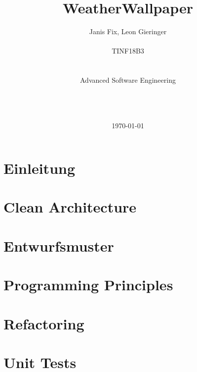 \documentclass[11pt,a4paper]{article}
\title{WeatherWallpaper\vspace{20px}}
\author{Janis Fix, Leon Gieringer \\ \\ TINF18B3 \\ \\ \\ Advanced Software Engineering \\ \\ \\ \\}
\date{\today}
\begin{document}
	\maketitle
	\thispagestyle{empty}
	\newpage
	
	\tableofcontents
	\newpage
	\listoflistings
	\newpage
	
	
	\pagestyle{fancy}
	\fancyhf{}
	\setlength{\headheight}{35pt}
	\cfoot{\thepage}
	\newpage
	
	
	\section{Einleitung}
	
	\newpage
	
	\section{Clean Architecture}
	
	\newpage
	\section{Entwurfsmuster}
	
	\newpage
	\section{Programming Principles}
	
	\newpage
	\section{Refactoring}
	
	\newpage
	\section{Unit Tests}
	
	
	
	
	
\end{document}
